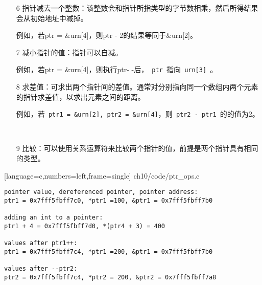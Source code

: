 \begin{frame}[fragile]\ft{\secname}
\begin{itemize}
\item[6] 指针减去一个整数：该整数会和指针所指类型的字节数相乘，然后所得结果会从初始地址中减掉。\\[0.1in]
\item[] 例如，若{\tf ptr = \&urn[4]}，则{\tf ptr - 2}的结果等同于{\tf \&urn[2]}。
\\[0.2in]

\item[7] 减小指针的值：指针可以自减。\\[0.1in]
\item[] 例如，若{\tf ptr = \&urn[4]}，则执行{\tf ptr- -}后，\lstinline| ptr |指向\lstinline| urn[3] |。
\end{itemize}
\end{frame}

\begin{frame}[fragile]\ft{\secname}
\begin{itemize}
\item[8] 求差值：可求出两个指针间的差值。通常对分别指向同一个数组内两个元素的指针求差值，以求出元素之间的距离。\\[0.1in]
\item[] 例如，若\lstinline| ptr1 = &urn[2], ptr2 = &urn[4]|，则\lstinline| ptr2 - ptr1 |的的值为2。\\[0.1in]
\item[]
\\[0.2in]

\item[9] 比较：可以使用关系运算符来比较两个指针的值，前提是两个指针具有相同的类型。
\end{itemize}
\end{frame}

\begin{frame}\ft{\secname}

[language=c,numbers=left,frame=single]
{ch10/code/ptr_ops.c}
\end{frame}


\begin{frame}[fragile]\ft{\secname}
\begin{lstlisting}[backgroundcolor=\color{red!20}]
pointer value, dereferenced pointer, pointer address:
ptr1 = 0x7fff5fbff7c0, *ptr1 =100, &ptr1 = 0x7fff5fbff7b0

adding an int to a pointer:
ptr1 + 4 = 0x7fff5fbff7d0, *(ptr4 + 3) = 400

values after ptr1++:
ptr1 = 0x7fff5fbff7c4, *ptr1 =200, &ptr1 = 0x7fff5fbff7b0

values after --ptr2:
ptr2 = 0x7fff5fbff7c4, *ptr2 = 200, &ptr2 = 0x7fff5fbff7a8

\end{lstlisting}
\end{frame}

